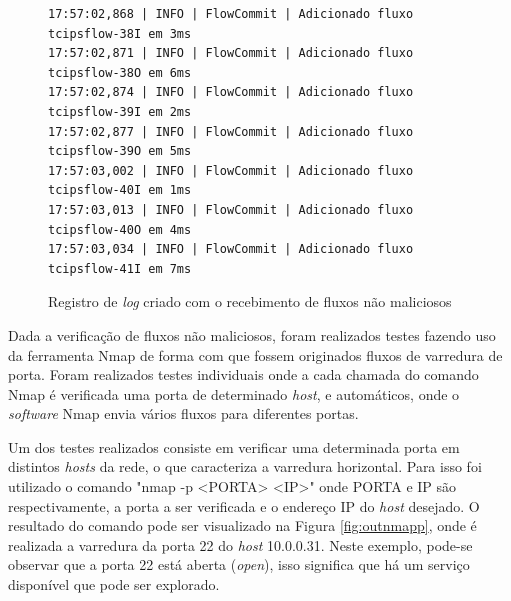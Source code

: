 \begin{figure}[H]
\centering
\caption{Registro de \textit{log} criado com o recebimento de fluxos não maliciosos}
\begin{lstlisting}[belowskip=-0.05\baselineskip]
17:57:02,868 | INFO | FlowCommit | Adicionado fluxo tcipsflow-38I em 3ms
17:57:02,871 | INFO | FlowCommit | Adicionado fluxo tcipsflow-38O em 6ms
17:57:02,874 | INFO | FlowCommit | Adicionado fluxo tcipsflow-39I em 2ms
17:57:02,877 | INFO | FlowCommit | Adicionado fluxo tcipsflow-39O em 5ms
17:57:03,002 | INFO | FlowCommit | Adicionado fluxo tcipsflow-40I em 1ms
17:57:03,013 | INFO | FlowCommit | Adicionado fluxo tcipsflow-40O em 4ms
17:57:03,034 | INFO | FlowCommit | Adicionado fluxo tcipsflow-41I em 7ms
\end{lstlisting}
\label{fig:lognormal}
\end{figure}
\FloatBarrier

Dada a verificação de fluxos não maliciosos, foram realizados testes fazendo uso da ferramenta Nmap de forma com que fossem originados fluxos de varredura de porta.  Foram realizados testes individuais onde a cada chamada do comando Nmap é verificada uma porta de determinado \textit{host}, e automáticos, onde o \textit{software} Nmap envia vários fluxos para diferentes portas. 

Um dos testes realizados consiste em verificar uma determinada porta em distintos \textit{hosts} da rede, o que caracteriza a varredura horizontal. Para isso foi utilizado o comando "nmap -p <PORTA> <IP>" onde PORTA e IP são respectivamente, a porta a ser verificada e o endereço IP do \textit{host} desejado. O resultado do comando pode ser visualizado na Figura \ref{fig:outnmapp}, onde é realizada a varredura da porta 22 do \textit{host} 10.0.0.31. Neste exemplo, pode-se observar que a porta 22 está aberta (\textit{open}), isso significa que há um serviço disponível que pode ser explorado.


